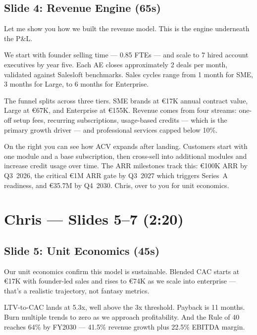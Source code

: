 \documentclass[11pt,a4paper]{article}
\begin{document}
\subsection{Slide 4: Revenue Engine (\texttildelow65s)}

Let me show you how we built the revenue model. This is the engine underneath the P\&L.

We start with founder selling time --- 0.85 FTEs --- and scale to 7 hired account executives by year five. Each AE closes approximately 2 deals per month, validated against Salesloft benchmarks. Sales cycles range from 1 month for SME, 3 months for Large, to 6 months for Enterprise.

The funnel splits across three tiers. SME brands at \euro{}17K annual contract value, Large at \euro{}67K, and Enterprise at \euro{}155K. Revenue comes from four streams: one-off setup fees, recurring subscriptions, usage-based credits --- which is the primary growth driver --- and professional services capped below 10\%.

On the right you can see how ACV expands after landing. Customers start with one module and a base subscription, then cross-sell into additional modules and increase credit usage over time. The ARR milestones track this: \euro{}100K ARR by Q3~2026, the critical \euro{}1M ARR gate by Q3~2027 which triggers Series~A readiness, and \euro{}35.7M by Q4~2030. Chris, over to you for unit economics.

\section{Chris --- Slides 5--7 (2:20)}

\subsection{Slide 5: Unit Economics (\texttildelow45s)}

Our unit economics confirm this model is sustainable. Blended CAC starts at \euro{}17K with founder-led sales and rises to \euro{}74K as we scale into enterprise --- that's a realistic trajectory, not fantasy metrics.

LTV-to-CAC lands at 5.3x, well above the 3x threshold. Payback is 11 months. Burn multiple trends to zero as we approach profitability. And the Rule of 40 reaches 64\% by FY2030 --- 41.5\% revenue growth plus 22.5\% EBITDA margin.
\end{document}
